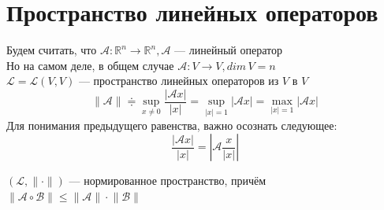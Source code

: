 \documentclass[11pt]{article}
\begin{document}
\section{Пространство линейных операторов}
\begin{definition}
    Будем считать, что $\mathcal{A} : \mathbb{R}^n \to \mathbb{R}^n , \mathcal{A}$ --- линейный оператор \\
    Но на самом деле, в общем случае $ \mathcal{A} : V\to V, dim\, V = n $\\
    $\mathcal{L} = \mathcal{L}(V,V)  $ --- пространство линейных операторов из $V$ в $V$ \\
    \[ \lVert \mathcal{A} \rVert \doteqdot \sup_{x \neq 0 } \frac{|\mathcal{A}x|}{|x|} = \sup_{|x|=1} |\mathcal{A}x| = \max_{|x|=1} |\mathcal{A}x|  \]
    Для понимания предыдущего равенства, важно осознать следующее:
    \[ \frac{|\mathcal{A}x|}{|x|} = \left| \mathcal{A} \frac{x}{|x|} \right| \] 
\end{definition}


\begin{statement}
    $(\mathcal{L}, \lVert \cdot \rVert)$ --- нормированное пространство, причём $\lVert \mathcal{A} \circ  \mathcal{B} \rVert \leq \lVert \mathcal{A}  \rVert \cdot \lVert \mathcal{B} \rVert$
\end{statement}
\end{document}
